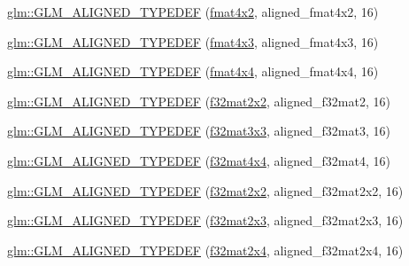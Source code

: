 \begin{DoxyCompactItemize}
\item 
\hyperlink{group__gtx__type__aligned_ga93f09768241358a287c4cca538f1f7e7}{glm\+::\+G\+L\+M\+\_\+\+A\+L\+I\+G\+N\+E\+D\+\_\+\+T\+Y\+P\+E\+D\+EF} (\hyperlink{group__gtc__type__precision_ga279cf309f0098c3d26ce88fe8a26375a}{fmat4x2}, aligned\+\_\+fmat4x2, 16)
\item 
\hyperlink{group__gtx__type__aligned_ga7c117e3ecca089e10247b1d41d88aff9}{glm\+::\+G\+L\+M\+\_\+\+A\+L\+I\+G\+N\+E\+D\+\_\+\+T\+Y\+P\+E\+D\+EF} (\hyperlink{group__gtc__type__precision_ga0ab797a258612fe48345951a0bdd6b8c}{fmat4x3}, aligned\+\_\+fmat4x3, 16)
\item 
\hyperlink{group__gtx__type__aligned_ga07c75cd04ba42dc37fa3e105f89455c5}{glm\+::\+G\+L\+M\+\_\+\+A\+L\+I\+G\+N\+E\+D\+\_\+\+T\+Y\+P\+E\+D\+EF} (\hyperlink{group__gtc__type__precision_gaeda4baa9a8e3113ff879dd5e7bdf5334}{fmat4x4}, aligned\+\_\+fmat4x4, 16)
\item 
\hyperlink{group__gtx__type__aligned_ga65ff0d690a34a4d7f46f9b2eb51525ee}{glm\+::\+G\+L\+M\+\_\+\+A\+L\+I\+G\+N\+E\+D\+\_\+\+T\+Y\+P\+E\+D\+EF} (\hyperlink{group__gtc__type__precision_ga3c0ffd3a47ae47ff05d5ea6e90825caa}{f32mat2x2}, aligned\+\_\+f32mat2, 16)
\item 
\hyperlink{group__gtx__type__aligned_gadd8ddbe2bf65ccede865ba2f510176dc}{glm\+::\+G\+L\+M\+\_\+\+A\+L\+I\+G\+N\+E\+D\+\_\+\+T\+Y\+P\+E\+D\+EF} (\hyperlink{group__gtc__type__precision_ga177c076d6d9aea27a5ae87b52607e57a}{f32mat3x3}, aligned\+\_\+f32mat3, 16)
\item 
\hyperlink{group__gtx__type__aligned_gaf18dbff14bf13d3ff540c517659ec045}{glm\+::\+G\+L\+M\+\_\+\+A\+L\+I\+G\+N\+E\+D\+\_\+\+T\+Y\+P\+E\+D\+EF} (\hyperlink{group__gtc__type__precision_ga2ba95a5c37eef05b26ac10e03daa5c84}{f32mat4x4}, aligned\+\_\+f32mat4, 16)
\item 
\hyperlink{group__gtx__type__aligned_ga66339f6139bf7ff19e245beb33f61cc8}{glm\+::\+G\+L\+M\+\_\+\+A\+L\+I\+G\+N\+E\+D\+\_\+\+T\+Y\+P\+E\+D\+EF} (\hyperlink{group__gtc__type__precision_ga3c0ffd3a47ae47ff05d5ea6e90825caa}{f32mat2x2}, aligned\+\_\+f32mat2x2, 16)
\item 
\hyperlink{group__gtx__type__aligned_ga1558a48b3934011b52612809f443e46d}{glm\+::\+G\+L\+M\+\_\+\+A\+L\+I\+G\+N\+E\+D\+\_\+\+T\+Y\+P\+E\+D\+EF} (\hyperlink{group__gtc__type__precision_ga1f5a1129669d427f5fbc5f02ff52c366}{f32mat2x3}, aligned\+\_\+f32mat2x3, 16)
\item 
\hyperlink{group__gtx__type__aligned_gaa52e5732daa62851627021ad551c7680}{glm\+::\+G\+L\+M\+\_\+\+A\+L\+I\+G\+N\+E\+D\+\_\+\+T\+Y\+P\+E\+D\+EF} (\hyperlink{group__gtc__type__precision_ga56deb277c1d5c1f42a80982372b4ed6c}{f32mat2x4}, aligned\+\_\+f32mat2x4, 16)

\end{DoxyCompactItemize}
